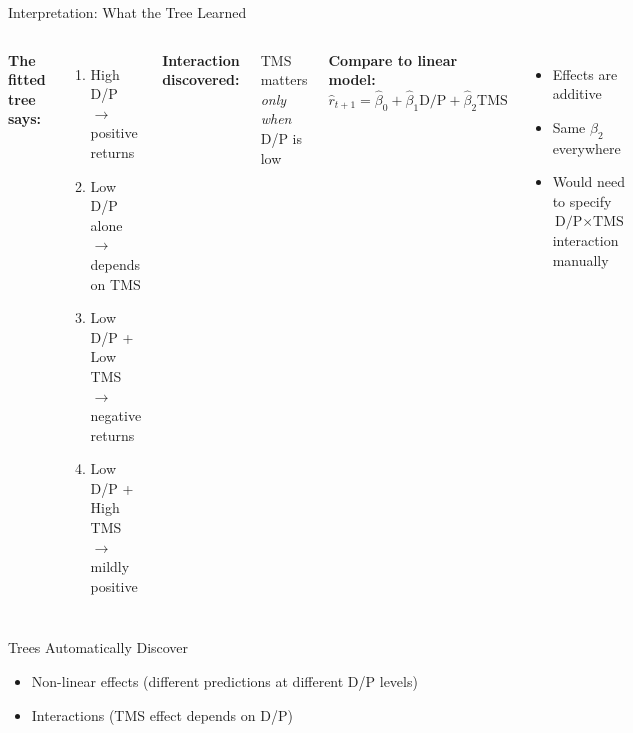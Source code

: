 \documentclass[10pt]{beamer}
\begin{document}

\begin{frame}{Interpretation: What the Tree Learned}

  \begin{columns}[T]
    \textbf{The fitted tree says:}

    \vspace{0.5em}
    \begin{enumerate}
      \item High D/P $\rightarrow$ positive returns
      \item Low D/P alone $\rightarrow$ depends on TMS
      \item Low D/P + Low TMS $\rightarrow$ negative returns
      \item Low D/P + High TMS $\rightarrow$ mildly positive
    \end{enumerate}

    \vspace{0.5em}
    \textbf{Interaction discovered:}

    TMS matters \textit{only when} D/P is low

    \textbf{Compare to linear model:}
    \[
    \widehat{r}_{t+1} = \widehat{\beta}_0 + \widehat{\beta}_1 \text{D/P} + \widehat{\beta}_2 \text{TMS}
    \]

    \begin{itemize}
      \item Effects are additive
      \item Same $\beta_2$ everywhere
      \item Would need to specify $\text{D/P} \times \text{TMS}$ interaction manually
    \end{itemize}
  \end{columns}

  \vspace{0.5em}
  \begin{block}{Trees Automatically Discover}
    \begin{itemize}
      \item Non-linear effects (different predictions at different D/P levels)
      \item Interactions (TMS effect depends on D/P)
    \end{itemize}
  \end{block}
\end{frame}
\end{document}
